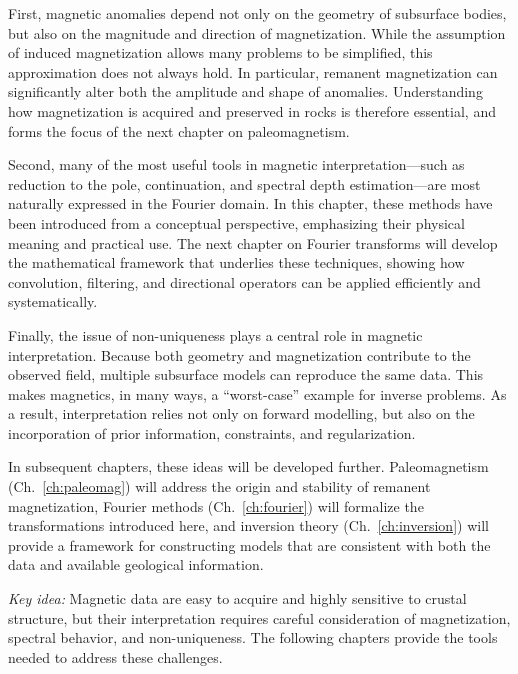 First, magnetic anomalies depend not only on the geometry of subsurface bodies, but also on the magnitude and direction of magnetization. While the assumption of induced magnetization allows many problems to be simplified, this approximation does not always hold. In particular, remanent magnetization can significantly alter both the amplitude and shape of anomalies. Understanding how magnetization is acquired and preserved in rocks is therefore essential, and forms the focus of the next chapter on paleomagnetism.

Second, many of the most useful tools in magnetic interpretation—such as reduction to the pole, continuation, and spectral depth estimation—are most naturally expressed in the Fourier domain. In this chapter, these methods have been introduced from a conceptual perspective, emphasizing their physical meaning and practical use. The next chapter on Fourier transforms will develop the mathematical framework that underlies these techniques, showing how convolution, filtering, and directional operators can be applied efficiently and systematically.

Finally, the issue of non-uniqueness plays a central role in magnetic interpretation. Because both geometry and magnetization contribute to the observed field, multiple subsurface models can reproduce the same data. This makes magnetics, in many ways, a “worst-case” example for inverse problems. As a result, interpretation relies not only on forward modelling, but also on the incorporation of prior information, constraints, and regularization.

In subsequent chapters, these ideas will be developed further. Paleomagnetism (Ch.~\ref{ch:paleomag}) will address the origin and stability of remanent magnetization, Fourier methods (Ch.~\ref{ch:fourier}) will formalize the transformations introduced here, and inversion theory (Ch.~\ref{ch:inversion}) will provide a framework for constructing models that are consistent with both the data and available geological information.

\emph{Key idea:} Magnetic data are easy to acquire and highly sensitive to crustal structure, but their interpretation requires careful consideration of magnetization, spectral behavior, and non-uniqueness. The following chapters provide the tools needed to address these challenges.


\nocite{Blakely1995}
\nocite{Breiner1973}
\nocite{Butler1992}
\nocite{Lowrie1997}
\nocite{Reynolds1997}



